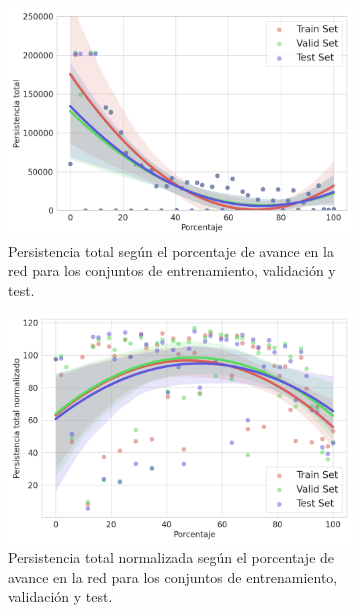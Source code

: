 \begin{figure}[H]
	\centering
	\begin{subfigure}{.45\textwidth}
		\centering
		\includegraphics[width=\linewidth]{img/m_set_base.png}
		\caption{Persistencia total según el porcentaje de avance en la red para los conjuntos de entrenamiento, validación y test.}
		\label{fig:m_set_base}
	\end{subfigure}
	\begin{subfigure}{.45\textwidth}
		\centering
		\includegraphics[width=\linewidth]{img/m_set_base_norm.png}
		\caption{Persistencia total normalizada según el porcentaje de avance en la red para los conjuntos de entrenamiento, validación y test.}
		\label{fig:m_set_base_norm}
	\end{subfigure}
	\begin{subfigure}{.45\textwidth}
		\centering

\end{subfigure}
\end{figure}
